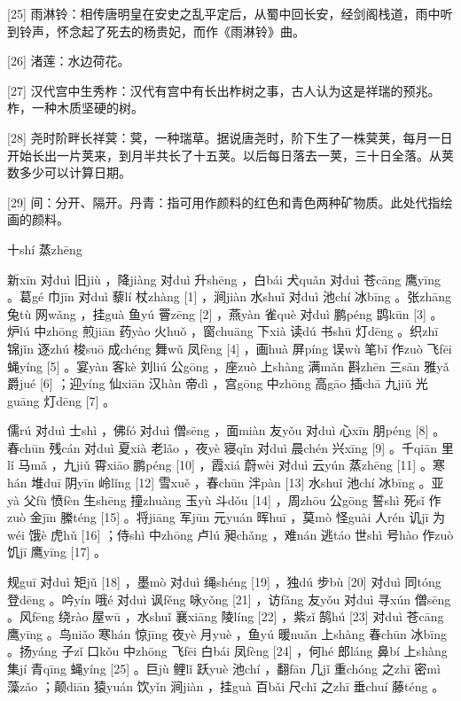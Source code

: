 \documentclass[12pt,UTF8]{ctexbook}
\begin{document}
[25] 雨淋铃：相传唐明皇在安史之乱平定后，从蜀中回长安，经剑阁栈道，雨中听到铃声，怀念起了死去的杨贵妃，而作《雨淋铃》曲。

[26] 渚莲：水边荷花。

[27] 汉代宫中生秀柞：汉代有宫中有长出柞树之事，古人认为这是祥瑞的预兆。柞，一种木质坚硬的树。

[28] 尧时阶畔长祥蓂：蓂，一种瑞草。据说唐尧时，阶下生了一株蓂荚，每月一日开始长出一片荚来，到月半共长了十五荚。以后每日落去一荚，三十日全落。从荚数多少可以计算日期。

[29] 间：分开、隔开。丹青：指可用作颜料的红色和青色两种矿物质。此处代指绘画的颜料。





十shí 蒸zhēng


新xīn 对duì 旧jiù ，降jiàng 对duì 升shēng ，白bái 犬quǎn 对duì 苍cāng 鹰yīng 。葛gé 巾jīn 对duì 藜lí 杖zhàng [1] ，涧jiàn 水shuǐ 对duì 池chí 冰bīng 。张zhāng 兔tù 网wǎng ，挂guà 鱼yú 罾zēng [2] ，燕yàn 雀què 对duì 鹏péng 鹍kūn [3] 。炉lú 中zhōng 煎jiān 药yào 火huǒ ，窗chuāng 下xià 读dú 书shū 灯dēng 。织zhī 锦jǐn 逐zhú 梭suō 成chéng 舞wǔ 凤fèng [4] ，画huà 屏píng 误wù 笔bǐ 作zuò 飞fēi 蝇yíng [5] 。宴yàn 客kè 刘liú 公gōng ，座zuò 上shàng 满mǎn 斟zhēn 三sān 雅yǎ 爵jué [6] ；迎yíng 仙xiān 汉hàn 帝dì ，宫gōng 中zhōng 高gāo 插chā 九jiǔ 光guāng 灯dēng [7] 。

儒rú 对duì 士shì ，佛fó 对duì 僧sēng ，面miàn 友yǒu 对duì 心xīn 朋péng [8] 。春chūn 残cán 对duì 夏xià 老lǎo ，夜yè 寝qǐn 对duì 晨chén 兴xīng [9] 。千qiān 里lǐ 马mǎ ，九jiǔ 霄xiāo 鹏péng [10] ，霞xiá 蔚wèi 对duì 云yún 蒸zhēng [11] 。寒hán 堆duī 阴yīn 岭lǐng [12] 雪xuě ，春chūn 泮pàn [13] 水shuǐ 池chí 冰bīng 。亚yà 父fù 愤fèn 生shēng 撞zhuàng 玉yù 斗dǒu [14] ，周zhōu 公gōng 誓shì 死sǐ 作zuò 金jīn 縢téng [15] 。将jiāng 军jūn 元yuán 晖huī ，莫mò 怪guài 人rén 讥jī 为wéi 饿è 虎hǔ [16] ；侍shì 中zhōng 卢lú 昶chǎng ，难nán 逃táo 世shì 号hào 作zuò 饥jī 鹰yīng [17] 。

规guī 对duì 矩jǔ [18] ，墨mò 对duì 绳shéng [19] ，独dú 步bù [20] 对duì 同tóng 登dēng 。吟yín 哦é 对duì 讽fěng 咏yǒng [21] ，访fǎng 友yǒu 对duì 寻xún 僧sēng 。风fēng 绕rào 屋wū ，水shuǐ 襄xiāng 陵líng [22] ，紫zǐ 鹄hú [23] 对duì 苍cāng 鹰yīng 。鸟niǎo 寒hán 惊jīng 夜yè 月yuè ，鱼yú 暖nuǎn 上shàng 春chūn 冰bīng 。扬yáng 子zǐ 口kǒu 中zhōng 飞fēi 白bái 凤fèng [24] ，何hé 郎láng 鼻bí 上shàng 集jí 青qīng 蝇yíng [25] 。巨jù 鲤lǐ 跃yuè 池chí ，翻fān 几jǐ 重chóng 之zhī 密mì 藻zǎo ；颠diān 猿yuán 饮yǐn 涧jiàn ，挂guà 百bǎi 尺chǐ 之zhī 垂chuí 藤téng 。
\end{document}
